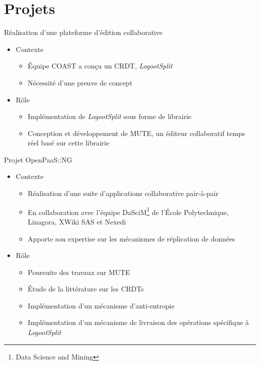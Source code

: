 \documentclass[xcolor=table]{beamer}
\begin{document}
\section{Projets}

\begin{frame}{Réalisation d'une plateforme d'édition collaborative}
  \begin{itemize}
	\item Contexte
		\begin{itemize}
		\item Équipe COAST a conçu un CRDT, \emph{LogootSplit}
		\item Nécessité d'une preuve de concept
		\end{itemize}
  \item Rôle
		\begin{itemize}
		\item Implémentation de \emph{LogootSplit} sous forme de librairie
		\item Conception et développement de MUTE, un éditeur collaboratif temps réel basé sur cette librairie
		\end{itemize}
  \end{itemize}
\end{frame}

\begin{frame}{Projet OpenPaaS::NG}
  \begin{itemize}
  \item Contexte
		\begin{itemize}
		\item Réalisation d'une suite d'applications collaborative pair-à-pair
		\item En collaboration avec l'équipe DaSciM\footnote{Data Science and Mining} de l'École Polytechnique, Linagora, XWiki SAS et Nexedi
		\item Apporte son expertise sur les mécanismes de réplication de données
		\end{itemize}
  \item Rôle
		\begin{itemize}
		\item Poursuite des travaux sur MUTE
		\item Étude de la littérature sur les CRDTs
		\item Implémentation d'un mécanisme d'anti-entropie
		\item Implémentation d'un mécanisme de livraison des opérations spécifique à \emph{LogootSplit}
		\end{itemize}
	\end{itemize}
\end{frame}
\end{document}
